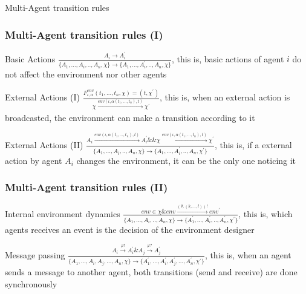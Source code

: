 	\begin{frame}
		\Huge{\centerline{Multi-Agent transition rules}}
	\end{frame}
	
	
	\begin{frame}
		\frametitle{Multi-Agent transition rules (I)}
		
		\begin{block}{Basic Actions}
			$\frac{A_i \rightarrow A^{\prime}_i}{\{A_1,...,A_i,..,A_n,\chi\} \rightarrow \{A_1,...,A^{\prime}_i,..,A_n,\chi\}}$, this is, basic actions of agent $i$ do not affect the environment nor other agents 
		\end{block}
		
		\begin{block}{External Actions (I)}
			$\frac{F^{env}_{\iota,\alpha}(t_1,...,t_n,\chi) = (t, \chi^\prime)}{ \chi \xrightarrow[]{env(\iota,\alpha(t_1,...,t_n),t)} \chi^\prime}$, this is, when an external action is broadcasted, the environment can make a transition according to it
		\end{block}
		
		\begin{block}{External Actions (II)}
			$\frac{ A_i \xrightarrow[]{env(\iota,\alpha(t_1,...,t_n),t)} A^\prime_i \&\& \chi \xrightarrow[]{env(\iota,\alpha(t_1,...,t_n),t)} \chi^\prime}{\{A_1,...,A_i,..,A_n,\chi\} \rightarrow \{A_1,...,A^{\prime}_i,..,A_n,\chi^\prime\} }$, this is, if a external action by agent $A_i$ changes the environment, it can be the only one noticing it
		\end{block}
		
	\end{frame}
	
	
	\begin{frame}
		\frametitle{Multi-Agent transition rules (II)}
		
		\begin{block}{Internal environment dynamics}
			$\frac{ env \in \chi \& env \xrightarrow{(\theta,(k,...,l))!} env^\prime}{\{A_1,...,A_i,..,A_n,\chi\} \rightarrow \{A^\prime_1,...,A^{\prime}_i,..,A^\prime_n,\chi^\prime\} }$, this is, which agents receives an event is the decision of the environment designer
		\end{block}
		
		\begin{block}{Message passing}
			$ \frac{A_i \xrightarrow[]{\varphi!} A^\prime_i \& A_j \xrightarrow[]{\varphi?} A^\prime_j}{\{A_1,...,A_i,A_j,...,A_n,\chi\} \rightarrow \{A^\prime_1,...,A^{\prime}_i,A^\prime_j,...,A^\prime_n,\chi^\prime\} } $, this is, when an agent sends a message to another agent, both transitions (send and receive) are done synchronously
		\end{block}
		
	\end{frame}